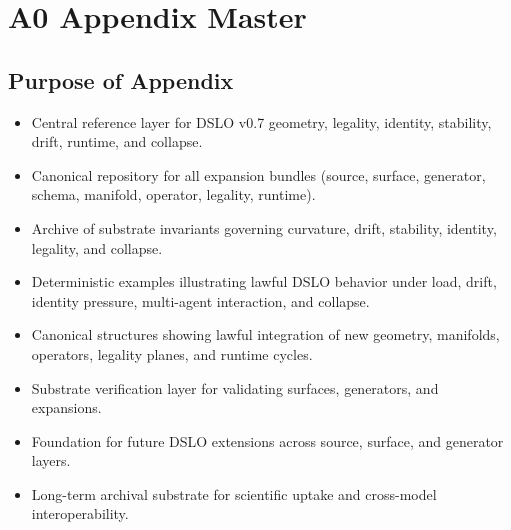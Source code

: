 \section{A0 Appendix Master}

\subsection{Purpose of Appendix}
\begin{itemize}
    \item Central reference layer for DSLO v0.7 geometry, legality, identity, stability, drift, runtime, and collapse.
    \item Canonical repository for all expansion bundles (source, surface, generator, schema, manifold, operator, legality, runtime).
    \item Archive of substrate invariants governing curvature, drift, stability, identity, legality, and collapse.
    \item Deterministic examples illustrating lawful DSLO behavior under load, drift, identity pressure, multi-agent interaction, and collapse.
    \item Canonical structures showing lawful integration of new geometry, manifolds, operators, legality planes, and runtime cycles.
    \item Substrate verification layer for validating surfaces, generators, and expansions.
    \item Foundation for future DSLO extensions across source, surface, and generator layers.
    \item Long-term archival substrate for scientific uptake and cross-model interoperability.
\end{itemize}


